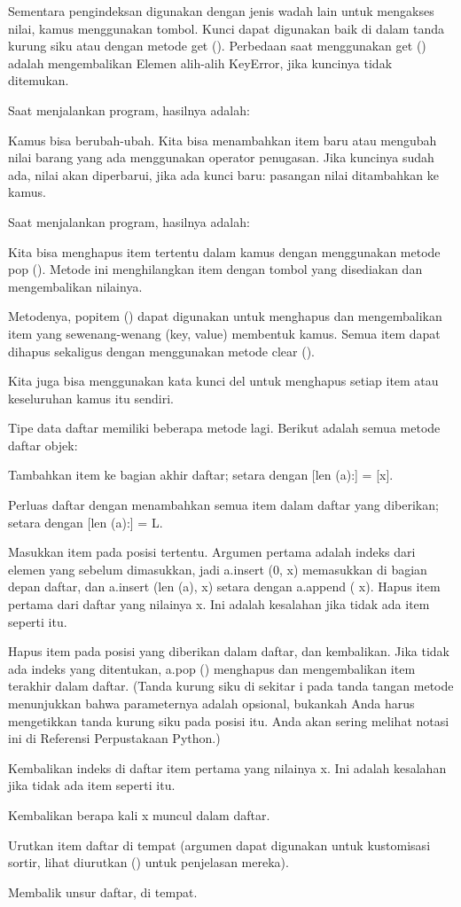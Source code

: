 Sementara pengindeksan digunakan dengan jenis wadah lain untuk mengakses nilai, kamus menggunakan tombol. Kunci dapat digunakan baik di dalam tanda kurung siku atau dengan metode get (). Perbedaan saat menggunakan get () adalah mengembalikan Elemen alih-alih KeyError, jika kuncinya tidak ditemukan. \par

Saat menjalankan program, hasilnya adalah: 

Kamus bisa berubah-ubah. Kita bisa menambahkan item baru atau mengubah nilai barang yang ada menggunakan operator penugasan. 
Jika kuncinya sudah ada, nilai akan diperbarui, jika ada kunci baru: pasangan nilai ditambahkan ke kamus. 

Saat menjalankan program, hasilnya adalah: 

Kita bisa menghapus item tertentu dalam kamus dengan menggunakan metode pop (). Metode ini menghilangkan item dengan tombol yang disediakan dan mengembalikan nilainya. \par

Metodenya, popitem () dapat digunakan untuk menghapus dan mengembalikan item yang sewenang-wenang (key, value) membentuk kamus. Semua item dapat dihapus sekaligus dengan menggunakan metode clear (). \par

Kita juga bisa menggunakan kata kunci del untuk menghapus setiap item atau keseluruhan kamus itu sendiri. 

Tipe data daftar memiliki beberapa metode lagi. Berikut adalah semua metode daftar objek: 

Tambahkan item ke bagian akhir daftar; setara dengan [len (a):] = [x]. 

Perluas daftar dengan menambahkan semua item dalam daftar yang diberikan; setara dengan [len (a):] = L. 
 
Masukkan item pada posisi tertentu. Argumen pertama adalah indeks dari elemen yang sebelum dimasukkan, jadi a.insert (0, x) memasukkan di bagian depan daftar, dan a.insert (len (a), x) setara dengan a.append ( x). 
Hapus item pertama dari daftar yang nilainya x. Ini adalah kesalahan jika tidak ada item seperti itu. 
 
Hapus item pada posisi yang diberikan dalam daftar, dan kembalikan. Jika tidak ada indeks yang ditentukan, a.pop () menghapus dan mengembalikan item terakhir dalam daftar. (Tanda kurung siku di sekitar i pada tanda tangan metode menunjukkan bahwa parameternya adalah opsional, bukankah Anda harus mengetikkan tanda kurung siku pada posisi itu. Anda akan sering melihat notasi ini di Referensi Perpustakaan Python.) \par

Kembalikan indeks di daftar item pertama yang nilainya x. Ini adalah kesalahan jika tidak ada item seperti itu. 
 
Kembalikan berapa kali x muncul dalam daftar.

Urutkan item daftar di tempat (argumen dapat digunakan untuk kustomisasi sortir, lihat diurutkan () untuk penjelasan mereka).

Membalik unsur daftar, di tempat. 

